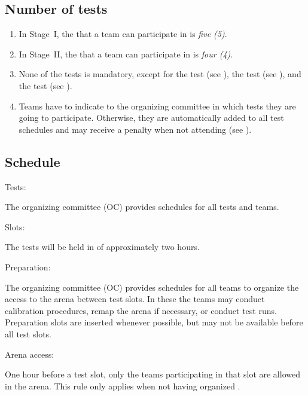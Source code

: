 \subsection{Number of tests}\label{rule:number_of_tests}

\begin{enumerate}
\item In Stage~I, the  that a team can participate in is \emph{five (5)}.
\item In Stage~II, the  that a team can participate in is \emph{four (4)}.
\item None of the tests is mandatory, except for the  test (see ), the  test (see ), and the  test (see ).
\item Teams have to indicate to the organizing committee in which tests they are going to participate. 
  Otherwise, they are automatically added to all test schedules and 
  may receive a penalty when not attending (see ).
\end{enumerate}


\subsection{Schedule}\label{rule:schedule}

\begin{enumerate}
{\bf\item Tests:} The organizing committee (OC) provides schedules for all tests and teams. 
{\bf\item Slots:} The tests will be held in  of approximately two hours.  
{\bf\item Preparation:} The organizing committee (OC) provides schedules for all teams to organize the access to the arena between test slots.
In these  the teams may conduct calibration procedures, remap the arena if necessary, or conduct test runs.
Preparation slots are inserted whenever possible, but may not be available before all test slots. 
{\bf\item Arena access:} One hour before a test slot, only the teams participating in that slot are allowed in the arena.
This rule only applies when not having organized .   
\end{enumerate}


